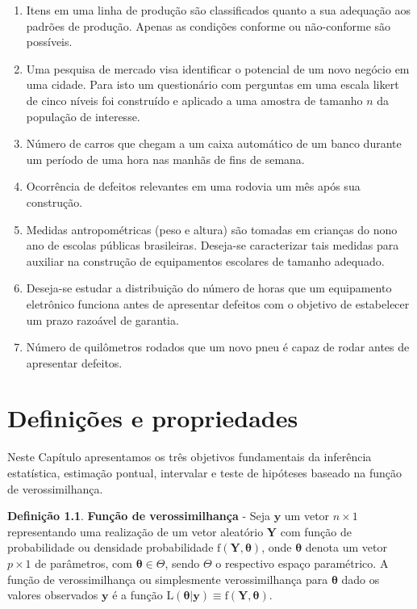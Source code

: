 \documentclass[
  9pt,
  a5paper,
]{book}
\providecommand{\tightlist}{%
  \setlength{\itemsep}{0pt}\setlength{\parskip}{0pt}}
\theoremstyle{definition}
\newtheorem{definition}{Definição}[chapter]
\theoremstyle{definition}
\theoremstyle{definition}
\theoremstyle{definition}
\theoremstyle{remark}
\begin{document}
\begin{enumerate}
  \begin{enumerate}
  \def\labelenumii{\alph{enumii})}
  \tightlist
  \item
    Itens em uma linha de produção são classificados quanto a sua adequação aos padrões de produção. Apenas as condições conforme ou não-conforme são possíveis.
  \item
    Uma pesquisa de mercado visa identificar o potencial de um novo negócio em uma cidade. Para isto um questionário com perguntas em uma escala likert de cinco níveis foi construído e aplicado a uma amostra de tamanho \(n\) da população de interesse.
  \item
    Número de carros que chegam a um caixa automático de um banco durante um período de uma hora nas manhãs de fins de semana.
  \item
    Ocorrência de defeitos relevantes em uma rodovia um mês após sua construção.
  \item
    Medidas antropométricas (peso e altura) são tomadas em crianças do nono ano de escolas públicas brasileiras. Deseja-se caracterizar tais medidas para auxiliar na construção de equipamentos escolares de tamanho adequado.
  \item
    Deseja-se estudar a distribuição do número de horas que um equipamento eletrônico funciona antes de apresentar defeitos com o objetivo de estabelecer um prazo razoável de garantia.
  \item
    Número de quilômetros rodados que um novo pneu é capaz de rodar antes de apresentar defeitos.
  \end{enumerate}
\end{enumerate}

\hypertarget{definiuxe7uxf5es-e-propriedades}{%
\chapter{Definições e propriedades}\label{definiuxe7uxf5es-e-propriedades}}

Neste Capítulo apresentamos os três objetivos fundamentais da inferência estatística, estimação pontual, intervalar e teste de hipóteses baseado na função de verossimilhança.

\begin{definition}
\protect\hypertarget{def:unnamed-chunk-4}{}\label{def:unnamed-chunk-4}\textbf{Função de verossimilhança} - Seja \(\mathbf{y}\) um vetor \(n \times 1\) representando uma realização de um vetor aleatório \(\mathbf{Y}\) com função de probabilidade ou densidade probabilidade \(\mathrm{f}(\mathbf{Y},\boldsymbol{\theta})\), onde \(\boldsymbol{\theta}\) denota um vetor \(p \times 1\) de parâmetros, com \(\boldsymbol{\theta} \in \Theta\), sendo \(\Theta\) o respectivo espaço paramétrico.
A função de verossimilhança ou simplesmente verossimilhança para \(\boldsymbol{\theta}\) dado os valores observados \(\mathbf{y}\)
é a função \(\mathrm{L}(\boldsymbol{\theta}| \mathbf{y}) \equiv \mathrm{f}(\mathbf{Y},\boldsymbol{\theta})\).
\end{definition}
\end{document}
